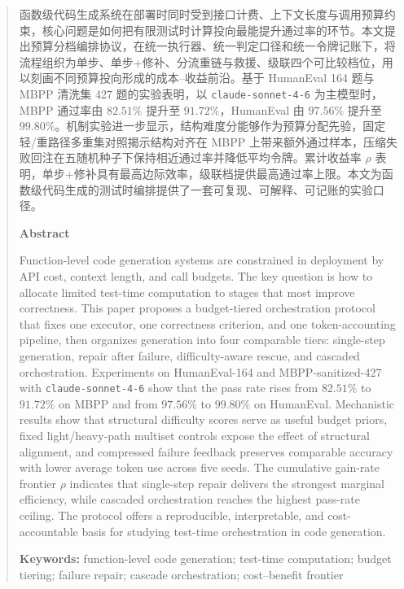 \begin{abstract}
函数级代码生成系统在部署时同时受到接口计费、上下文长度与调用预算约束，核心问题是如何把有限测试时计算投向最能提升通过率的环节。本文提出预算分档编排协议，在统一执行器、统一判定口径和统一令牌记账下，将流程组织为单步、单步+修补、分流重链与救援、级联四个可比较档位，用以刻画不同预算投向形成的成本--收益前沿。基于 HumanEval 164 题与 MBPP 清洗集 427 题的实验表明，以 \texttt{claude-sonnet-4-6} 为主模型时，MBPP 通过率由 $82.51\%$ 提升至 $91.72\%$，HumanEval 由 $97.56\%$ 提升至 $99.80\%$。机制实验进一步显示，结构难度分能够作为预算分配先验，固定轻/重路径多重集对照揭示结构对齐在 MBPP 上带来额外通过样本，压缩失败回注在五随机种子下保持相近通过率并降低平均令牌。累计收益率 $\rho$ 表明，单步+修补具有最高边际效率，级联档提供最高通过率上限。本文为函数级代码生成的测试时编排提供了一套可复现、可解释、可记账的实验口径。

\begin{center}
    \textbf{Abstract}
\end{center}
Function-level code generation systems are constrained in deployment by API cost, context length, and call budgets. The key question is how to allocate limited test-time computation to stages that most improve correctness. This paper proposes a budget-tiered orchestration protocol that fixes one executor, one correctness criterion, and one token-accounting pipeline, then organizes generation into four comparable tiers: single-step generation, repair after failure, difficulty-aware rescue, and cascaded orchestration. Experiments on HumanEval-164 and MBPP-sanitized-427 with \texttt{claude-sonnet-4-6} show that the pass rate rises from $82.51\%$ to $91.72\%$ on MBPP and from $97.56\%$ to $99.80\%$ on HumanEval. Mechanistic results show that structural difficulty scores serve as useful budget priors, fixed light/heavy-path multiset controls expose the effect of structural alignment, and compressed failure feedback preserves comparable accuracy with lower average token use across five seeds. The cumulative gain-rate frontier $\rho$ indicates that single-step repair delivers the strongest marginal efficiency, while cascaded orchestration reaches the highest pass-rate ceiling. The protocol offers a reproducible, interpretable, and cost-accountable basis for studying test-time orchestration in code generation.

\textbf{Keywords:} function-level code generation; test-time computation; budget tiering; failure repair; cascade orchestration; cost--benefit frontier
\end{abstract}
